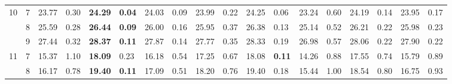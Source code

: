 \documentclass[conference]{IEEEtran}
\begin{document}
\begin{table}[t]
\begin{tabular}{|cc|ll|ll|ll|ll|ll|ll|ll|ll|}
		\multicolumn{1}{|c|}{\multirow{3}{*}{10}} & 7          & \multicolumn{1}{l|}{23.77}         & 0.30                              & \multicolumn{1}{l|}{\textbf{24.29}} & \textbf{0.04}                     & \multicolumn{1}{l|}{24.03}         & 0.09                              & \multicolumn{1}{l|}{23.99}         & 0.22                              & \multicolumn{1}{l|}{24.25}                & 0.06          & \multicolumn{1}{l|}{23.24} & 0.60 & \multicolumn{1}{l|}{24.19}          & 0.14          & \multicolumn{1}{l|}{23.95} & 0.17 \\ \cline{2-18} 
		\multicolumn{1}{|c|}{}                    & 8          & \multicolumn{1}{l|}{25.59}         & 0.28                              & \multicolumn{1}{l|}{\textbf{26.44}} & \textbf{0.09}                     & \multicolumn{1}{l|}{26.00}         & 0.16                              & \multicolumn{1}{l|}{25.95}         & 0.37                              & \multicolumn{1}{l|}{26.38}                & 0.13          & \multicolumn{1}{l|}{25.14} & 0.52 & \multicolumn{1}{l|}{26.21}          & 0.22          & \multicolumn{1}{l|}{25.98} & 0.23 \\ \cline{2-18} 
		\multicolumn{1}{|c|}{}                    & 9          & \multicolumn{1}{l|}{27.44}         & 0.32                              & \multicolumn{1}{l|}{\textbf{28.37}} & \textbf{0.11}                     & \multicolumn{1}{l|}{27.87}         & 0.14                              & \multicolumn{1}{l|}{27.77}         & 0.35                              & \multicolumn{1}{l|}{28.33}                & 0.19          & \multicolumn{1}{l|}{26.98} & 0.57 & \multicolumn{1}{l|}{28.06}          & 0.22          & \multicolumn{1}{l|}{27.90} & 0.22 \\ \hline
		\multicolumn{1}{|c|}{\multirow{3}{*}{11}} & 7          & \multicolumn{1}{l|}{15.37}         & 1.10                              & \multicolumn{1}{l|}{\textbf{18.09}} & 0.23                              & \multicolumn{1}{l|}{16.18}         & 0.54                              & \multicolumn{1}{l|}{17.25}         & 0.67                              & \multicolumn{1}{l|}{18.08}                & \textbf{0.11} & \multicolumn{1}{l|}{14.26} & 0.88 & \multicolumn{1}{l|}{17.55}          & 0.74          & \multicolumn{1}{l|}{15.79} & 0.89 \\ \cline{2-18} 
		\multicolumn{1}{|c|}{}                    & 8          & \multicolumn{1}{l|}{16.17}         & 0.78                              & \multicolumn{1}{l|}{\textbf{19.40}} & \textbf{0.11}                     & \multicolumn{1}{l|}{17.09}         & 0.51                              & \multicolumn{1}{l|}{18.20}         & 0.76                              & \multicolumn{1}{l|}{19.40}                & 0.18          & \multicolumn{1}{l|}{15.44} & 1.00 & \multicolumn{1}{l|}{18.54}          & 0.80          & \multicolumn{1}{l|}{16.75} & 0.93 \\ \cline{2-18} 

\end{tabular}
\end{table}
\end{document}
